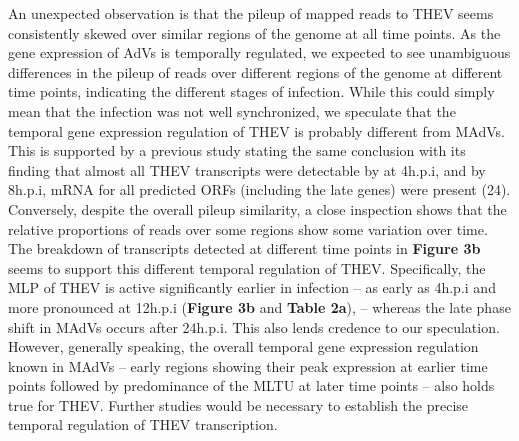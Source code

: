 \documentclass[
]{article}
\begin{document}
An unexpected observation is that the pileup of mapped reads to THEV
seems consistently skewed over similar regions of the genome at all time
points. As the gene expression of AdVs is temporally regulated, we
expected to see unambiguous differences in the pileup of reads over
different regions of the genome at different time points, indicating the
different stages of infection. While this could simply mean that the
infection was not well synchronized, we speculate that the temporal gene
expression regulation of THEV is probably different from MAdVs. This is
supported by a previous study stating the same conclusion with its
finding that almost all THEV transcripts were detectable by at 4h.p.i,
and by 8h.p.i, mRNA for all predicted ORFs (including the late genes)
were present (24). Conversely, despite the overall pileup similarity, a
close inspection shows that the relative proportions of reads over some
regions show some variation over time. The breakdown of transcripts
detected at different time points in \textbf{Figure 3b} seems to support
this different temporal regulation of THEV. Specifically, the MLP of
THEV is active significantly earlier in infection -- as early as 4h.p.i
and more pronounced at 12h.p.i (\textbf{Figure 3b} and \textbf{Table
2a}), -- whereas the late phase shift in MAdVs occurs after 24h.p.i.
This also lends credence to our speculation. However, generally
speaking, the overall temporal gene expression regulation known in MAdVs
-- early regions showing their peak expression at earlier time points
followed by predominance of the MLTU at later time points -- also holds
true for THEV. Further studies would be necessary to establish the
precise temporal regulation of THEV transcription.
\end{document}
